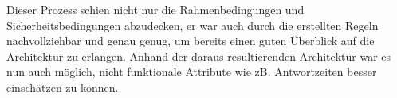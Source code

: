 Dieser Prozess schien nicht nur die Rahmenbedingungen und Sicherheitsbedingungen abzudecken, er war auch durch die erstellten Regeln nachvollziehbar und genau genug, um bereits einen guten Überblick auf die Architektur zu erlangen. Anhand der daraus resultierenden Architektur war es nun auch möglich, nicht funktionale Attribute wie zB. Antwortzeiten besser einschätzen zu können.
